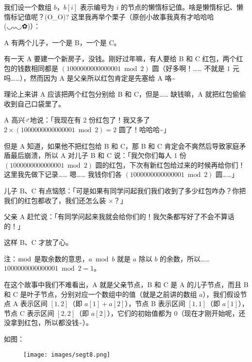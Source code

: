 我们设一个数组 $b$，$b[i]$ 表示编号为 $i$ 的节点的懒惰标记值。啥是懒惰标记、懒惰标记值呢？(O\_O)? 这里我再举个栗子（原创小故事我真有才哈哈哈 (◡ᴗ◡✿)）：

\begin{QUOTE}{}{}
A 有两个儿子，一个是 B，一个是 C。



有一天 A 要建一个新房子，没钱。刚好过年嘛，有人要给 B 和 C 红包，两个红包的钱数相同都是 $(1000000000000001\bmod 2)$ 圆（好多啊！…… 不就是 $1$ 元吗……），然而因为 A 是父亲所以红包肯定是先塞给 A 咯\textasciitilde{}



理论上来讲 A 应该把两个红包分别给 B 和 C，但是…… 缺钱嘛，A 就把红包偷偷收到自己口袋里了。



A 高兴♂地说：「我现在有 $2$ 份红包了！我又多了 $2\times (1000000000000001\bmod 2)=2$ 圆了！哈哈哈\textasciitilde{}」



但是 A 知道，如果他不把红包给 B 和 C，那 B 和 C 肯定会不爽然后导致家庭矛盾最后崩溃，所以 A 对儿子 B 和 C 说：「我欠你们每人 $1$ 份 $(1000000000000001\bmod 2)$ 圆的红包，下次有新红包给过来的时候再给你们！这里我先做下记录…… 嗯…… 我钱你们各 $(1000000000000001\bmod 2)$ 圆……」



儿子 B、C 有点恼怒：「可是如果有同学问起我们我们收到了多少红包咋办？你把我们的红包都收了，我们还怎么装 ×？」



父亲 A 赶忙说：「有同学问起来我就会给你们的！我欠条都写好了不会不算话的！」



这样 B、C 才放了心。



注：$\bmod$ 是取余数的意思，$a\bmod b$ 就是 $a$ 除以 $b$ 的余数，所以……$1000000000000001\bmod 2=1$。
\end{QUOTE}

在这个故事中我们不难看出，A 就是父亲节点，B 和 C 是 A 的儿子节点，而且 B 和 C 是叶子节点，分别对应一个数组中的值（就是之前讲的数组 $a$），我们假设节点 A 表示区间 $[1,2]$（即 $a[1]+a[2]$），节点 B 表示区间 $[1,1]$（即 $a[1]$），节点 C 表示区间 $[2,2]$（即 $a[2]$），它们的初始值都为 $0$（现在才刚开始呢，还没拿到红包，所以都没钱\textasciitilde{}）。

如图：

\begin{figure}[h]
\centering
\texttt{[image: images/segt8.png]} 

\end{figure}

